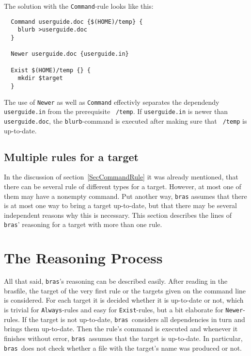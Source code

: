 \documentclass[12pt]{article}
\newcommand{\bras}{\texttt{bras}}
\begin{document}
The solution with the \texttt{Command}-rule looks like this:
\begin{verbatim}
  Command userguide.doc {$(HOME)/temp} {
    blurb >userguide.doc
  }

  Newer userguide.doc {userguide.in}

  Exist $(HOME)/temp {} {
    mkdir $target
  }
\end{verbatim}

The use of \texttt{Newer} as well as \texttt{Command} effectivly
separates the dependendy \texttt{userguide.in} from the prerequisite
\texttt{~{}/temp}. If \texttt{userguide.in} is newer than
\texttt{userguide.doc}, the \texttt{blurb}-command is executed after
making sure that \texttt{~{}/temp} is up-to-date.



\subsection{Multiple rules for a target}
In the discussion of section~\ref{SecCommandRule} it was already
mentioned, that there can be several rule of different types for a
target. However, at most one of them may have a nonempty command. Put
another way, \bras{} assumes that there is at most one way to bring a
target up-to-date, but that there may be several independent reasons
why this is necessary. This section describes the lines of \bras'
reasoning for a target with more than one rule.




\section{The Reasoning Process}
All that said, \bras's reasoning can be described easily.  After
reading in the brasfile, the target of the very first rule or the
targets given on the command line is considered. For each target it
is decided whether it is up-to-date or not, which is trivial for
\texttt{Always}-rules and easy for \texttt{Exist}-rules, but a bit
elaborate for \texttt{Newer}-rules. If the target is not up-to-date,
\bras\ considers all dependencies in turn and brings them
up-to-date. Then the rule's command is executed and whenever it
finishes without error, \bras\ assumes that the target is
up-to-date. In particular, \bras\ does not check whether a file with
the target's name was produced or not.
\end{document}
